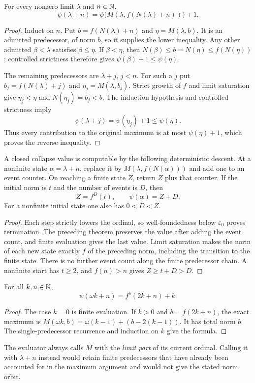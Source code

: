 \begin{theorem}
\label{f:thm:single-predecessor}
For every nonzero limit $\lambda$ and $n\in\mathbb N$,
\[
 \psi(\lambda+n)
   =\psi\bigl(M(\lambda,f(N(\lambda)+n))\bigr)+1.
\]
\end{theorem}
\begin{proof}
Induct on $n$.  Put $b=f(N(\lambda)+n)$ and
$\eta=M(\lambda,b)$.  It is an admitted predecessor, of norm $b$,
so it supplies the lower inequality.  Any other admitted $\beta<\lambda$
satisfies $\beta\le\eta$.  If $\beta<\eta$, then
$N(\beta)\le b=N(\eta)\le f(N(\eta))$; controlled strictness
therefore gives $\psi(\beta)+1\le\psi(\eta)$.

The remaining predecessors are $\lambda+j$, $j<n$.  For such a $j$
put $b_j=f(N(\lambda)+j)$ and $\eta_j=M(\lambda,b_j)$.
Strict growth of $f$ and limit saturation give
$\eta_j<\eta$ and $N(\eta_j)=b_j<b$.
The induction hypothesis and controlled strictness imply
\[
 \psi(\lambda+j)=\psi(\eta_j)+1\le\psi(\eta).
\]
Thus every contribution to the original maximum is at most
$\psi(\eta)+1$, which proves the reverse inequality.
\end{proof}

\begin{corollary}
\label{f:cor:closed-evaluation}
A closed collapse value is computable by the following deterministic
descent.  At a nonfinite state $\alpha=\lambda+n$, replace it by
$M(\lambda,f(N(\alpha)))$ and add one to an event counter.
On reaching a finite state $Z$, return $Z$ plus that counter.
If the initial norm is $t$ and the number of events is $D$, then
\[
 Z=f^D(t),\qquad \psi(\alpha)=Z+D.
\]
For a nonfinite initial state one also has $0<D<Z$.
\end{corollary}
\begin{proof}
Each step strictly lowers the ordinal, so well-foundedness below
$\varepsilon_0$ proves termination.  The preceding theorem preserves
the value after adding the event count, and finite evaluation gives the
last value.  Limit saturation makes the norm of each new state exactly
$f$ of the preceding norm, including the transition to the finite state.
There is no further event count along the finite predecessor chain.
A nonfinite start has $t\ge2$, and $f(n)>n$ gives
$Z\ge t+D>D$.
\end{proof}

\begin{corollary}\label{f:cor:finite-coefficient}
For all $k,n\in\mathbb N$,
\[
 \psi(\omega k+n)=f^k(2k+n)+k.
\]
\end{corollary}
\begin{proof}
The case $k=0$ is finite evaluation.  If $k>0$ and
$b=f(2k+n)$, the exact maximum is
$M(\omega k,b)=\omega(k-1)+(b-2(k-1))$.
It has total norm $b$.  The single-predecessor recurrence and induction
on $k$ give the formula.
\end{proof}

The evaluator always calls $M$ with the \emph{limit part} of its
current ordinal.  Calling it with $\lambda+n$ instead would retain
finite predecessors that have already been accounted for in the maximum
argument and would not give the stated norm orbit.
